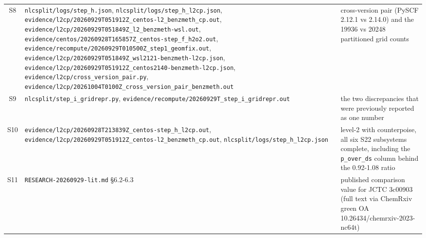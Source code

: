 \documentclass[11pt]{article}
\begin{document}
\begin{longtable}{c>{\raggedright\arraybackslash}p{}>{\raggedright\arraybackslash}p{}}
S8 & \texttt{nlcsplit/logs/step\_h.json}, \texttt{nlcsplit/\allowbreak{}logs/\allowbreak{}step\_\allowbreak{}h\_\allowbreak{}l2cp.json}, \texttt{evidence/\allowbreak{}l2cp/\allowbreak{}20260929T051912Z\_\allowbreak{}centos-l2\_\allowbreak{}benzmeth\_\allowbreak{}cp.out}, \texttt{evidence/\allowbreak{}l2cp/\allowbreak{}20260929T051849Z\_\allowbreak{}l2\_\allowbreak{}benzmeth-wsl.out}, \texttt{evidence/\allowbreak{}centos/\allowbreak{}20260928T165857Z\_\allowbreak{}centos-step\_\allowbreak{}f\_\allowbreak{}h2o2.out}, \texttt{evidence/\allowbreak{}recompute/\allowbreak{}20260929T010500Z\_\allowbreak{}step1\_\allowbreak{}geomfix.out}, \texttt{evidence/\allowbreak{}l2cp/\allowbreak{}20260929T051849Z\_\allowbreak{}wsl2121-benzmeth-l2cp.json}, \texttt{evidence/\allowbreak{}l2cp/\allowbreak{}20260929T051912Z\_\allowbreak{}centos2140-benzmeth-l2cp.json}, \texttt{evidence/\allowbreak{}l2cp/\allowbreak{}cross\_\allowbreak{}version\_\allowbreak{}pair.py}, \texttt{evidence/\allowbreak{}l2cp/\allowbreak{}20261004T0100Z\_\allowbreak{}cross\_\allowbreak{}version\_\allowbreak{}pair\_\allowbreak{}benzmeth.out} & cross-version pair (PySCF 2.12.1 vs 2.14.0) and the 19936 vs 20248 partitioned grid counts \\
S9 & \texttt{nlcsplit/\allowbreak{}step\_\allowbreak{}i\_\allowbreak{}gridrepr.py}, \texttt{evidence/\allowbreak{}recompute/\allowbreak{}20260929T\_\allowbreak{}step\_\allowbreak{}i\_\allowbreak{}gridrepr.out} & the two discrepancies that were previously reported as one number \\
S10 & \texttt{evidence/\allowbreak{}l2cp/\allowbreak{}20260928T213839Z\_\allowbreak{}centos-step\_\allowbreak{}h\_\allowbreak{}l2cp.out}, \texttt{evidence/\allowbreak{}l2cp/\allowbreak{}20260929T051912Z\_\allowbreak{}centos-l2\_\allowbreak{}benzmeth\_\allowbreak{}cp.out}, \texttt{nlcsplit/\allowbreak{}logs/\allowbreak{}step\_\allowbreak{}h\_\allowbreak{}l2cp.json} & level-2 with counterpoise, all six S22 subsystems complete, including the \texttt{p\_over\_ds} column behind the 0.92-1.08 ratio \\
S11 & \texttt{RESEARCH-20260929-lit.md} \S{}6.2-6.3 & published comparison value for JCTC 3c00903 (full text via ChemRxiv green OA 10.26434/chemrxiv-2023-nc64t) \\

\end{longtable}
\end{document}
